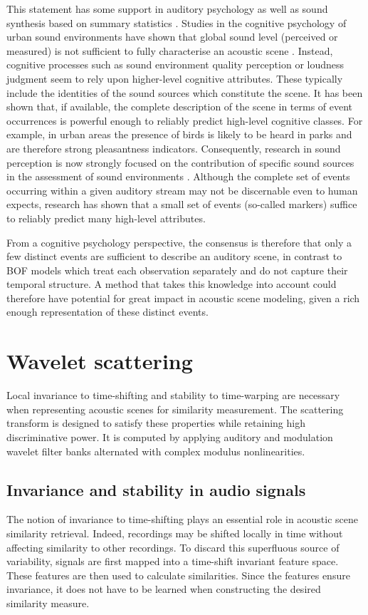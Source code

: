 \documentclass[smallextended]{svjour3}
\begin{document}
This statement has some support in auditory psychology as well as sound synthesis based on summary statistics \cite{mcdermott2013summary}. Studies in the cognitive psychology of urban sound environments have shown that global sound level (perceived or measured) is not sufficient to fully characterise an acoustic scene \cite{guyot2005urban,kang2006urban}. Instead, cognitive processes such as sound environment quality perception \cite{dubois2006cognitive} or loudness judgment \cite{kuwano_memory_2003} seem to rely upon higher-level cognitive attributes. These typically include the identities of the sound sources which constitute the scene. It has been shown that, if available, the complete description of the scene in terms of event occurrences is powerful enough to reliably predict high-level cognitive classes. For example, in urban areas the presence of birds is likely to be heard in parks and are therefore strong pleasantness indicators. Consequently, research in sound perception is now strongly focused on the contribution of specific sound sources in the assessment of sound environments \cite{ricciardi2015sound,lavandier2006contribution}. Although the complete set of events occurring within a given auditory stream may not be discernable even to human expects, research has shown that a small set of events (so-called markers) suffice to reliably predict many high-level attributes.

From a cognitive psychology perspective, the consensus is therefore that only a few distinct events are sufficient to describe an auditory scene, in contrast to BOF models which treat each observation separately and do not capture their temporal structure. A method that takes this knowledge into account could therefore have potential for great impact in acoustic scene modeling, given a rich enough representation of these distinct events.

\section{Wavelet scattering \label{sec:scattering}}

Local invariance to time-shifting and stability to time-warping are necessary when representing acoustic scenes for similarity measurement.
The scattering transform is designed to satisfy these properties while retaining high discriminative power.
It is computed by applying auditory and modulation wavelet filter banks alternated with complex modulus nonlinearities.

\subsection{Invariance and stability in audio signals}
The notion of invariance to time-shifting plays an essential role in acoustic scene similarity retrieval.
Indeed, recordings may be shifted locally in time without affecting similarity to other recordings.
To discard this superfluous source of variability, signals are first mapped into a time-shift invariant feature space. These features are then used to calculate similarities. Since the features ensure invariance, it does not have to be learned when constructing the desired similarity measure.
\end{document}

